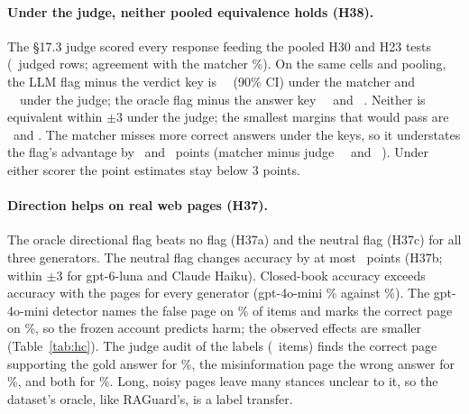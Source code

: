 \paragraph{Under the judge, neither pooled equivalence holds (H38).} The \S17.3 judge scored every response feeding the
pooled H30 and H23 tests (\jdN\ judged rows; agreement with the matcher \jdAgree\%). On the same cells and pooling,
the LLM flag minus the verdict key is \jdThirtyM\ \jdThirtyMNinetyCI\ (90\% CI) under the matcher and
\jdThirtyJ\ \jdThirtyJNinetyCI\ under the judge; the oracle flag minus the answer key \jdTwentyThreeM\
\jdTwentyThreeMNinetyCI\ and \jdTwentyThreeJ\ \jdTwentyThreeJNinetyCI. Neither is equivalent within $\pm$3 under the
judge; the smallest margins that would pass are \jdThirtyJMargin\ and \jdTwentyThreeJMargin. The matcher misses more
correct answers under the keys, so it understates the flag's advantage by \ajdThirtyShift\ and
\ajdTwentyThreeShift\ points (matcher minus judge \jdThirtyShift\ \jdThirtyShiftCI\ and \jdTwentyThreeShift\ \jdTwentyThreeShiftCI). Under either scorer the point estimates stay below 3 points.

\paragraph{Direction helps on real web pages (H37).} The oracle directional
flag beats no flag (H37a) and the neutral flag (H37c) for all three generators. The neutral flag changes accuracy by at
most \ahcNeuMini\ points (H37b; within $\pm$3 for gpt-6-luna and Claude Haiku). Closed-book accuracy exceeds accuracy
with the pages for every generator (gpt-4o-mini \hcCbMini\% against \hcPlainMini\%). The gpt-4o-mini detector names
the false page on \hcLlmRightMini\% of items and marks the correct page on \hcLlmWrongMini\%, so the frozen account
predicts harm; the observed effects are smaller (Table~\ref{tab:hc}). The judge audit of the labels (\hcLabN\ items)
finds the correct page supporting the gold answer for \hcLabCorrect\%, the misinformation page the wrong answer for
\hcLabMis\%, and both for \hcLabBoth\%. Long, noisy pages leave many stances unclear to it, so the
dataset's oracle, like RAGuard's, is a label transfer.
